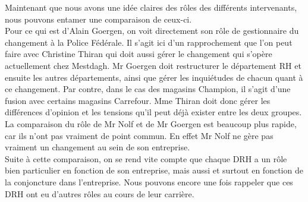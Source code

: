 Maintenant que nous avons une idée claires des rôles des différents intervenants, nous pouvons entamer une comparaison de ceux-ci. \\


Pour ce qui est d'Alain Goergen, on voit directement son rôle de gestionnaire du changement à la Police Fédérale. Il s'agit ici d'un rapprochement que l'on peut faire avec Christine Thiran qui doit aussi gérer le changement qui s'opère actuellement chez Mestdagh. Mr Goergen doit restructurer le département RH et ensuite les autres départements, ainsi que gérer les inquiétudes de chacun quant à ce changement. Par contre, dans le cas des magasins Champion, il s'agit d'une fusion avec certains magasins Carrefour. Mme Thiran doit donc gérer les différences d'opinion et les tensions qu'il peut déjà exister entre les deux groupes. \\

La comparaison du rôle de Mr Nolf et de Mr Goergen est beaucoup plus rapide, car ils n'ont pas vraiment de point commun. En effet Mr Nolf ne gère pas vraiment un changement au sein de son entreprise. \\

Suite à cette comparaison, on se rend vite compte que chaque DRH a un rôle bien particulier en fonction de son entreprise, mais aussi et surtout en fonction de la conjoncture dans l'entreprise. Nous pouvons encore une fois rappeler que ces DRH ont eu d'autres rôles au cours de leur carrière. 